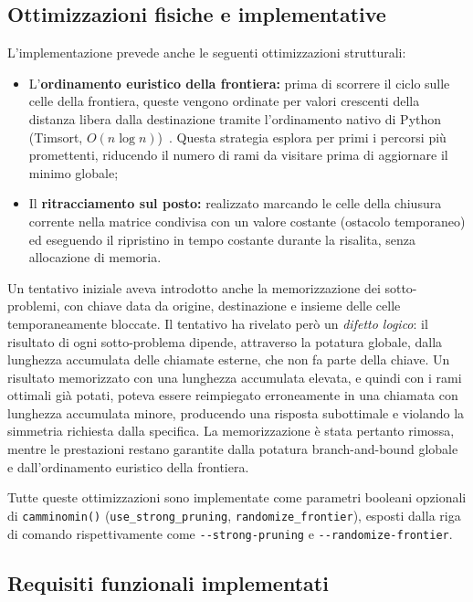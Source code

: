 \subsection{Ottimizzazioni fisiche e implementative}

L'implementazione prevede anche le seguenti ottimizzazioni strutturali:
\begin{itemize}
    \item L'\textbf{ordinamento euristico della frontiera:} prima di scorrere il ciclo sulle celle della frontiera, queste vengono ordinate per valori crescenti della distanza libera dalla destinazione tramite l'ordinamento nativo di Python (Timsort, $O(n \log n)$)~\cite{python-sort}. Questa strategia esplora per primi i percorsi più promettenti, riducendo il numero di rami da visitare prima di aggiornare il minimo globale;
    \item Il \textbf{ritracciamento sul posto:} realizzato marcando le celle della chiusura corrente nella matrice condivisa con un valore costante (ostacolo temporaneo) ed eseguendo il ripristino in tempo costante durante la risalita, senza allocazione di memoria.
\end{itemize}

Un tentativo iniziale aveva introdotto anche la memorizzazione dei sotto-problemi, con chiave data da origine, destinazione e insieme delle celle temporaneamente bloccate. Il tentativo ha rivelato però un \textit{difetto logico}: il risultato di ogni sotto-problema dipende, attraverso la potatura globale, dalla lunghezza accumulata delle chiamate esterne, che non fa parte della chiave. Un risultato memorizzato con una lunghezza accumulata elevata, e quindi con i rami ottimali già potati, poteva essere reimpiegato erroneamente in una chiamata con lunghezza accumulata minore, producendo una risposta subottimale e violando la simmetria richiesta dalla specifica. La memorizzazione è stata pertanto rimossa, mentre le prestazioni restano garantite dalla potatura branch-and-bound globale e dall'ordinamento euristico della frontiera.

Tutte queste ottimizzazioni sono implementate come parametri booleani opzionali di \texttt{camminomin()} (\texttt{use\_strong\_pruning}, \texttt{randomize\_frontier}), esposti dalla riga di comando rispettivamente come \texttt{-{}-strong-pruning} e \texttt{-{}-randomize-frontier}.

\newpage
\subsection{Requisiti funzionali implementati}

